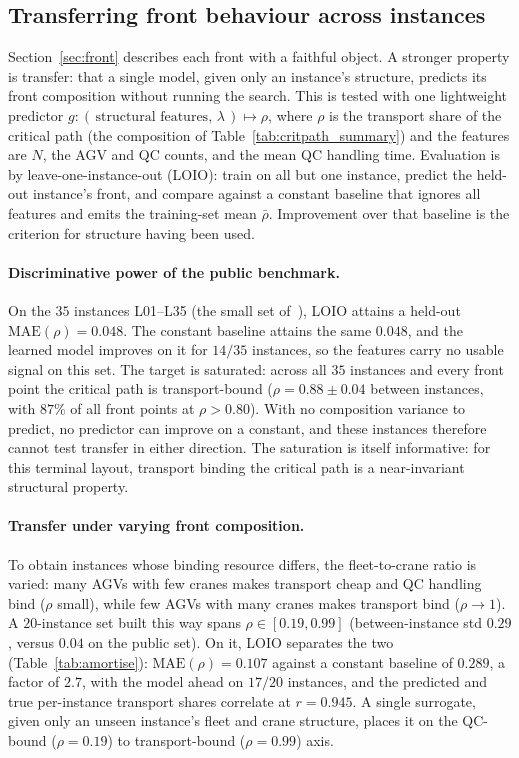 \documentclass[11pt]{article}
\begin{document}
\subsection{Transferring front behaviour across instances}
\label{sec:amortise}
Section~\ref{sec:front} describes each front with a faithful object. A stronger property
is transfer: that a single model, given only an instance's structure, predicts its front
composition without running the search. This is tested with one lightweight predictor
$g:(\,\text{structural features},\,\lambda\,)\mapsto\rho$, where $\rho$ is the transport
share of the critical path (the composition of Table~\ref{tab:critpath_summary}) and the
features are $N$, the AGV and QC counts, and the mean QC handling time. Evaluation is by
leave-one-instance-out (LOIO): train on all but one instance, predict the held-out
instance's front, and compare against a constant baseline that ignores all features and
emits the training-set mean $\bar\rho$. Improvement over that baseline is the criterion
for structure having been used.

\paragraph{Discriminative power of the public benchmark.} On the $35$
instances \textsf{L01}--\textsf{L35} (the small set of~\cite{homayouni2022book}), LOIO
attains a held-out $\mathrm{MAE}(\rho)=0.048$. The constant baseline attains the same
$0.048$, and the learned model improves on it for $14/35$ instances, so the features carry
no usable signal on this set. The target is saturated: across all $35$ instances and every
front point the critical path is transport-bound ($\rho=0.88\pm0.04$ between instances,
with $87\%$ of all front points at $\rho>0.80$). With no composition variance to predict,
no predictor can improve on a constant, and these instances therefore cannot test transfer
in either direction. The saturation is itself informative: for this terminal layout,
transport binding the critical path is a near-invariant structural property.

\paragraph{Transfer under varying front composition.} To obtain instances whose binding resource
differs, the fleet-to-crane ratio is varied: many AGVs with few cranes makes transport
cheap and QC handling bind ($\rho$ small), while few AGVs with many cranes makes transport
bind ($\rho\!\to\!1$). A $20$-instance set built this way spans
$\rho\in[0.19,0.99]$ (between-instance std $0.29$, versus $0.04$ on the public set). On it,
LOIO separates the two (Table~\ref{tab:amortise}): $\mathrm{MAE}(\rho)=0.107$ against a
constant baseline of $0.289$, a factor of $2.7$, with the model ahead on $17/20$ instances,
and the predicted and true per-instance transport shares correlate at $r=0.945$. A single
surrogate, given only an unseen instance's fleet and crane structure, places it on the
QC-bound ($\rho=0.19$) to transport-bound ($\rho=0.99$) axis.
\end{document}
